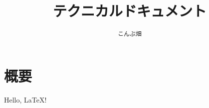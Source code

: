 ﻿\documentclass[a4j,uplatex]{jsarticle}
\begin{document}
\title{テクニカルドキュメント}
\author{\texttt{こんぶ畑}}
\maketitle
\section{概要}
Hello, \LaTeX!
\end{document}
